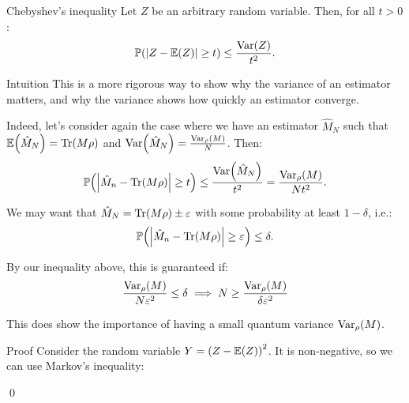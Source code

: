 \documentclass[a4paper]{article}
\begin{document}
\begin{parag}{Chebyshev's inequality}
    Let $Z$ be an arbitrary random variable. Then, for all $t > 0$: 
    \[\prob\left(\left|Z - \exval\left(Z\right)\right| \geq t\right) \leq \frac{\Var\left(Z\right)}{t^2}.\]

    \begin{subparag}{Intuition}
        This is a more rigorous way to show why the variance of an estimator matters, and why the variance shows how quickly an estimator converge.

        Indeed, let's consider again the case where we have an estimator $\hat{M}_N$ such that $\exval\left(\hat{M}_N\right) = \Tr\left(M \rho\right)$ and $\Var\left(\hat{M}_N\right) = \frac{\Var_{\rho}\left(M\right)}{N}$. Then:
        \[\prob\left(\left|\hat{M}_n - \Tr\left(M \rho\right)\right| \geq t\right) \leq \frac{\Var\left(\hat{M}_N\right)}{t^2} = \frac{\Var_{\rho}\left(M\right)}{N t^2}.\]

        We may want that $\hat{M}_N = \Tr\left(M \rho\right) \pm \epsilon$ with some probability at least $1 - \delta$, i.e.: 
        \[\prob\left(\left|\hat{M}_n - \Tr\left(M \rho\right)\right| \geq \epsilon\right) \leq \delta.\]

        By our inequality above, this is guaranteed if:
        \[\frac{\Var_{\rho}\left(M\right)}{N \epsilon^2} \leq \delta \implies N \geq \frac{\Var_{\rho}\left(M\right)}{\delta \epsilon^2}\]

        This does show the importance of having a small quantum variance $\Var_{\rho}\left(M\right)$.
    \end{subparag}

    \begin{subparag}{Proof}
       Consider the random variable $Y = \left(Z - \exval\left(Z\right)\right)^2$. It is non-negative, so we can use Markov's inequality: 

       \qed
    \end{subparag}
\end{parag}
\end{document}
